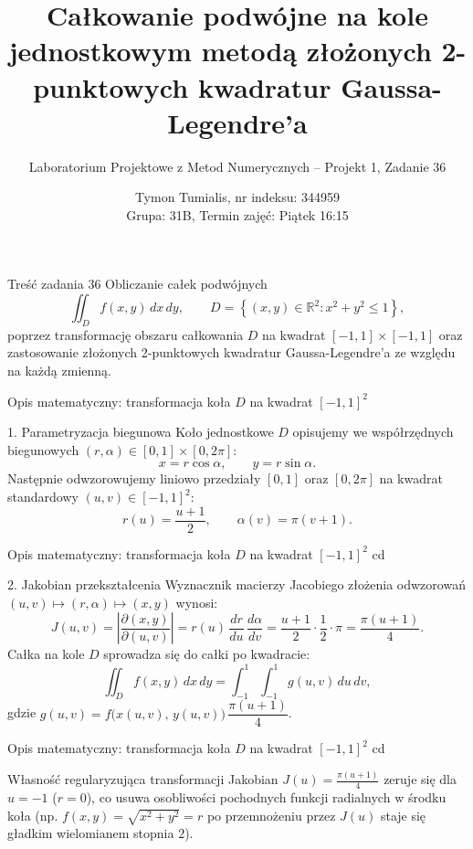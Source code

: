 \documentclass[aspectratio=169, 10pt, xcolor={table}]{beamer}
\title[Projekt 1, Zadanie 36]{Całkowanie podwójne na kole jednostkowym metodą złożonych 2-punktowych kwadratur Gaussa-Legendre'a}
\subtitle{Laboratorium Projektowe z Metod Numerycznych -- Projekt 1, Zadanie 36}
\author[Tymon Tumialis]{Tymon Tumialis, nr indeksu: 344959 \\ \small Grupa: 31B, Termin zajęć: Piątek 16:15}
\date{}
\begin{document}
\begin{frame}
  \titlepage
  \vspace{-2.cm}
  \begin{block}{Treść zadania 36}
    Obliczanie całek podwójnych
    \[
      \iint_{D} f(x,y)\,dx\,dy, \qquad D = \left\{(x,y) \in \mathbb{R}^2 : x^2 + y^2 \le 1\right\},
    \]
    poprzez transformację obszaru całkowania $D$ na kwadrat $[-1, 1] \times [-1, 1]$ oraz zastosowanie złożonych 2-punktowych kwadratur Gaussa-Legendre'a ze względu na każdą zmienną.
  \end{block}
\end{frame}

\begin{frame}{Opis matematyczny: transformacja koła $D$ na kwadrat $[-1,1]^2$}
      \begin{block}{1. Parametryzacja biegunowa}
        Koło jednostkowe $D$ opisujemy we współrzędnych biegunowych $(r, \alpha) \in [0, 1] \times [0, 2\pi]$:
        \[
          x = r\cos\alpha, \qquad y = r\sin\alpha.
        \]
        Następnie odwzorowujemy liniowo przedziały $[0,1]$ oraz $[0,2\pi]$ na kwadrat standardowy $(u,v) \in [-1,1]^2$:
        \[
          r(u) = \frac{u + 1}{2}, \qquad \alpha(v) = \pi(v + 1).
        \]
      \end{block}
\end{frame}
\begin{frame}{Opis matematyczny: transformacja koła $D$ na kwadrat $[-1,1]^2$ cd}
      \begin{block}{2. Jakobian przekształcenia}
        Wyznacznik macierzy Jacobiego złożenia odwzorowań $(u,v) \mapsto (r,\alpha) \mapsto (x,y)$ wynosi:
        \[
          J(u,v) = \left|\frac{\partial(x,y)}{\partial(u,v)}\right|
          = r(u)\,\frac{dr}{du}\,\frac{d\alpha}{dv}
          = \frac{u+1}{2} \cdot \frac{1}{2} \cdot \pi
          = \frac{\pi(u+1)}{4}.
        \]
        Całka na kole $D$ sprowadza się do całki po kwadracie:
        \[
          \iint_D f(x,y)\,dx\,dy = \int_{-1}^{1}\!\int_{-1}^{1} g(u,v)\,du\,dv,
        \]
        gdzie $g(u,v) = f\big(x(u,v),\, y(u,v)\big)\,\dfrac{\pi(u+1)}{4}$.
      \end{block}
\end{frame}
\begin{frame}{Opis matematyczny: transformacja koła $D$ na kwadrat $[-1,1]^2$ cd}
  \vspace{0.25cm}
  \begin{exampleblock}{Własność regularyzująca transformacji}
    Jakobian $J(u) = \frac{\pi(u+1)}{4}$ zeruje się dla $u = -1$ ($r = 0$), co usuwa osobliwości pochodnych funkcji radialnych w środku koła (np. $f(x,y) = \sqrt{x^2+y^2} = r$ po przemnożeniu przez $J(u)$ staje się gładkim wielomianem stopnia $2$).
  \end{exampleblock}
\end{frame}
\end{document}
